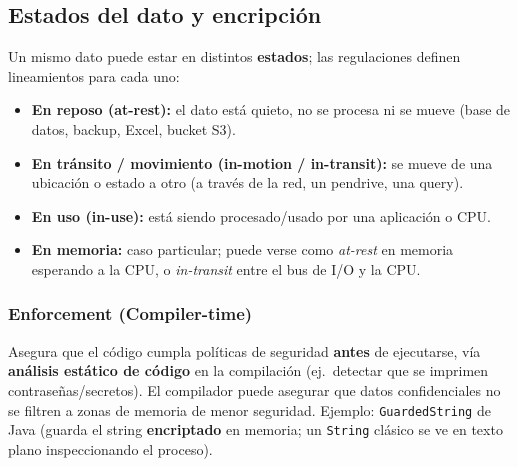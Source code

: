 \documentclass[../main.tex]{subfiles}
\begin{document}
\subsection{Estados del dato y encripción}

Un mismo dato puede estar en distintos \textbf{estados}; las regulaciones definen
lineamientos para cada uno:
\begin{itemize}[nosep]
  \item \textbf{En reposo (at-rest):} el dato está quieto, no se procesa ni se mueve
        (base de datos, backup, Excel, bucket S3).
  \item \textbf{En tránsito / movimiento (in-motion / in-transit):} se mueve de una
        ubicación o estado a otro (a través de la red, un pendrive, una query).
  \item \textbf{En uso (in-use):} está siendo procesado/usado por una aplicación o CPU.
  \item \textbf{En memoria:} caso particular; puede verse como \emph{at-rest} en memoria
        esperando a la CPU, o \emph{in-transit} entre el bus de I/O y la CPU.
\end{itemize}

\subsubsection{Enforcement (Compiler-time)}
Asegura que el código cumpla políticas de seguridad \textbf{antes} de ejecutarse, vía
\textbf{análisis estático de código} en la compilación (ej.\ detectar que se imprimen
contraseñas/secretos). El compilador puede asegurar que datos confidenciales no se
filtren a zonas de memoria de menor seguridad. Ejemplo: \texttt{GuardedString} de Java
(guarda el string \textbf{encriptado} en memoria; un \texttt{String} clásico se ve en
texto plano inspeccionando el proceso).
\end{document}
